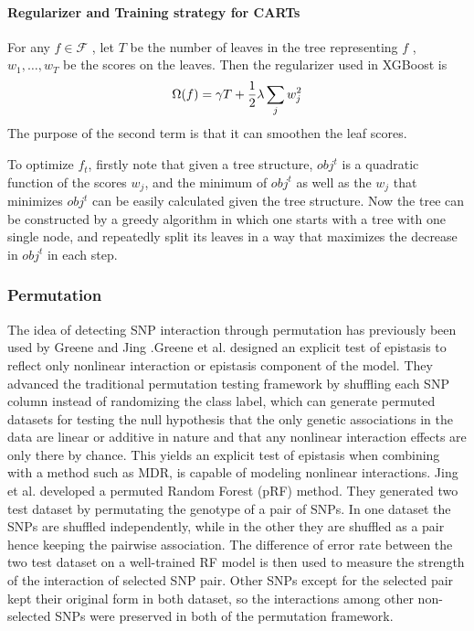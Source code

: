 \documentclass[11pt]{article}
\theoremstyle{plain}
\theoremstyle{definition}
\theoremstyle{remark}
\begin{document}
\paragraph{Regularizer and Training strategy for CARTs}

For any $f\in\mathcal{F}$ , let $T$ be the number of leaves in the tree representing $f$ , $w_1,\dots, w_T$ be the scores on
the leaves. Then the regularizer used in XGBoost is
\begin{equation}
\Omega(f)=\gamma T+{1\over 2}\lambda\sum_j w_j^2
\end{equation}
The purpose of the second term is that it can smoothen the leaf scores.

To optimize $f_t$, firstly note that given a tree structure, $obj^t$ is a quadratic function of the scores $w_j$,
and the minimum of $obj^t$ as well as the $w_j$ that minimizes $obj^t$ can be easily calculated given the tree structure. Now the tree can be constructed by a greedy algorithm in which one starts with a tree with
one single node, and repeatedly split its leaves in a way that maximizes the decrease in $obj^t$ in each step.

\subsubsection{Permutation}

The idea of detecting SNP interaction through permutation has previously been used by Greene \cite{10}
and Jing \cite{2}.Greene et al. designed an explicit test of epistasis to reflect only nonlinear interaction
or epistasis component of the model. They advanced the traditional permutation testing framework
by shuffling each SNP column instead of randomizing the class label, which can generate permuted
datasets for testing the null hypothesis that the only genetic associations in the data are linear or
additive in nature and that any nonlinear interaction effects are only there by chance. This yields an
explicit test of epistasis when combining with a method such as MDR, is capable of modeling
nonlinear interactions. Jing et al. developed a permuted Random Forest (pRF) method. They
generated two test dataset by permutating the genotype of a pair of SNPs. In one dataset the SNPs
are shuffled independently, while in the other they are shuffled as a pair hence keeping the pairwise
association. The difference of error rate between the two test dataset on a well-trained RF model is
then used to measure the strength of the interaction of selected SNP pair. Other SNPs except for the
selected pair kept their original form in both dataset, so the interactions among other non-selected
SNPs were preserved in both of the permutation framework.\\
\end{document}
